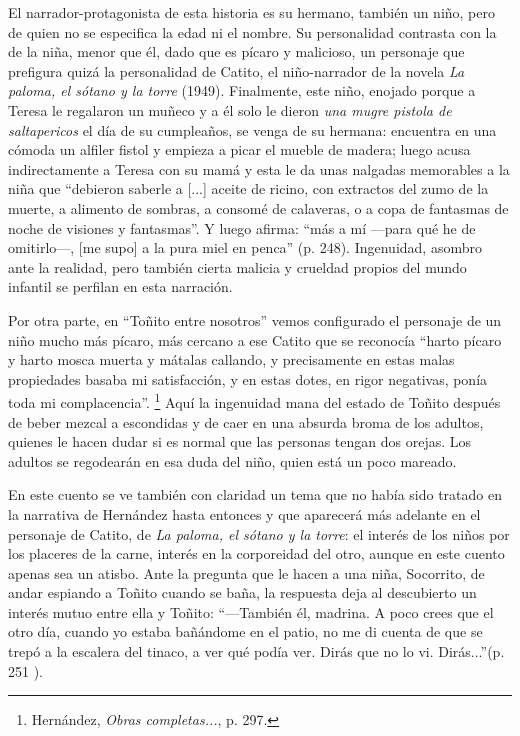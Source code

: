 \documentclass[14pt,twoside,final]{extbook} %
\let\oldfootnote\footnote
\renewcommand\footnote[1]{%
\oldfootnote{\hspace{1mm}#1}}
\begin{document}
El narrador-protagonista de esta historia es su hermano, también un niño, pero de quien no se especifica la edad ni el nombre. Su personalidad contrasta con la de la niña, menor que él, dado que es pícaro y malicioso, un personaje que prefigura quizá la personalidad de Catito, el niño-narrador de la novela \emph{La paloma, el sótano y la torre} (1949). Finalmente, este niño, enojado porque a Teresa le regalaron un muñeco y a él solo le dieron \emph{una mugre pistola de saltapericos} el día de su cumpleaños, se venga de su hermana: encuentra en una cómoda un alfiler fistol y empieza a picar el mueble de madera; luego acusa indirectamente a Teresa con su mamá y esta le da unas nalgadas memorables a la niña que ``debieron saberle a [...] aceite de ricino, con extractos del zumo de la muerte, a alimento de sombras, a consomé de calaveras, o a copa de fantasmas de noche de visiones y fantasmas''. Y luego afirma: ``más a mí ---para qué he de omitirlo---, [me supo] a la pura miel en penca'' (p. 248). Ingenuidad, asombro ante la realidad, pero también cierta malicia y crueldad propios del mundo infantil se perfilan en esta narración.

Por otra parte, en ``Toñito entre nosotros'' vemos configurado el personaje de un niño mucho más pícaro, más cercano a ese Catito que se reconocía ``harto pícaro y harto mosca muerta y mátalas callando, y precisamente en estas malas propiedades basaba mi satisfacción, y en estas dotes, en rigor negativas, ponía toda mi complacencia''.\footnote{Hernández, \emph{Obras completas...}, p. 297.} Aquí la ingenuidad mana del estado de Toñito después de beber mezcal a escondidas y de caer en una absurda broma de los adultos, quienes le hacen dudar si es normal que las personas tengan dos orejas. Los adultos se regodearán en esa duda del niño, quien está un poco mareado.

En este cuento se ve también con claridad un tema que no había sido tratado en la narrativa de Hernández hasta entonces y que aparecerá más adelante en el personaje de Catito, de \emph{La paloma, el sótano y la torre}: el interés de los niños por los placeres de la carne, interés en la corporeidad del otro, aunque en este cuento apenas sea un atisbo. Ante la pregunta que le hacen a una niña, Socorrito, de andar espiando a Toñito cuando se baña, la respuesta deja al descubierto un interés mutuo entre ella y Toñito: ``---También él, madrina. A poco crees que el otro día, cuando yo estaba bañándome en el patio, no me di cuenta de que se trepó a la escalera del tinaco, a ver qué podía ver. Dirás que no lo vi. Dirás...''(p. 251 ).
\end{document}
